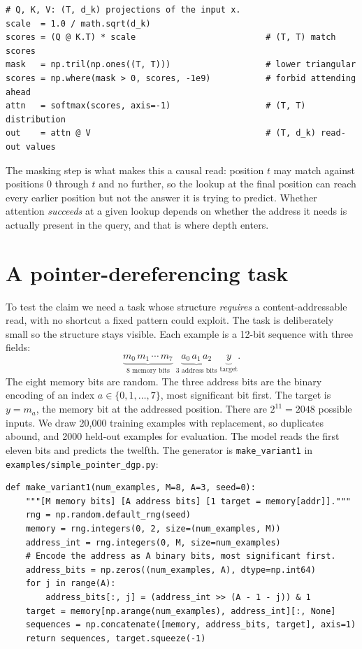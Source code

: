 \begin{lstlisting}
# Q, K, V: (T, d_k) projections of the input x.
scale  = 1.0 / math.sqrt(d_k)
scores = (Q @ K.T) * scale                          # (T, T) match scores
mask   = np.tril(np.ones((T, T)))                   # lower triangular
scores = np.where(mask > 0, scores, -1e9)           # forbid attending ahead
attn   = softmax(scores, axis=-1)                   # (T, T) distribution
out    = attn @ V                                   # (T, d_k) read-out values
\end{lstlisting}

The masking step is what makes this a causal read: position $t$ may match
against positions $0$ through $t$ and no further, so the lookup at the final
position can reach every earlier position but not the answer it is trying to
predict. Whether attention \emph{succeeds} at a given lookup depends on
whether the address it needs is actually present in the query, and that is
where depth enters.

\section{A pointer-dereferencing task}\label{sec:pointer-task}

To test the claim we need a task whose structure \emph{requires} a
content-addressable read, with no shortcut a fixed pattern could exploit. The
task is deliberately small so the structure stays visible. Each example is a
12-bit sequence with three fields:
\[
  \underbrace{m_0\, m_1\, \cdots\, m_7}_{\text{8 memory bits}}\;
  \underbrace{a_0\, a_1\, a_2}_{\text{3 address bits}}\;
  \underbrace{y}_{\text{target}} .
\]
The eight memory bits are random. The three address bits are the binary
encoding of an index $a \in \{0, 1, \ldots, 7\}$, most significant bit first.
The target is $y = m_a$, the memory bit at the addressed position. There are
$2^{11} = 2048$ possible inputs. We draw 20{,}000 training examples with
replacement, so duplicates abound, and 2000 held-out examples for evaluation.
The model reads the first eleven bits and predicts the twelfth. The generator
is \texttt{make\_variant1} in \texttt{examples/simple\_pointer\_dgp.py}:

\begin{lstlisting}
def make_variant1(num_examples, M=8, A=3, seed=0):
    """[M memory bits] [A address bits] [1 target = memory[addr]]."""
    rng = np.random.default_rng(seed)
    memory = rng.integers(0, 2, size=(num_examples, M))
    address_int = rng.integers(0, M, size=num_examples)
    # Encode the address as A binary bits, most significant first.
    address_bits = np.zeros((num_examples, A), dtype=np.int64)
    for j in range(A):
        address_bits[:, j] = (address_int >> (A - 1 - j)) & 1
    target = memory[np.arange(num_examples), address_int][:, None]
    sequences = np.concatenate([memory, address_bits, target], axis=1)
    return sequences, target.squeeze(-1)
\end{lstlisting}

